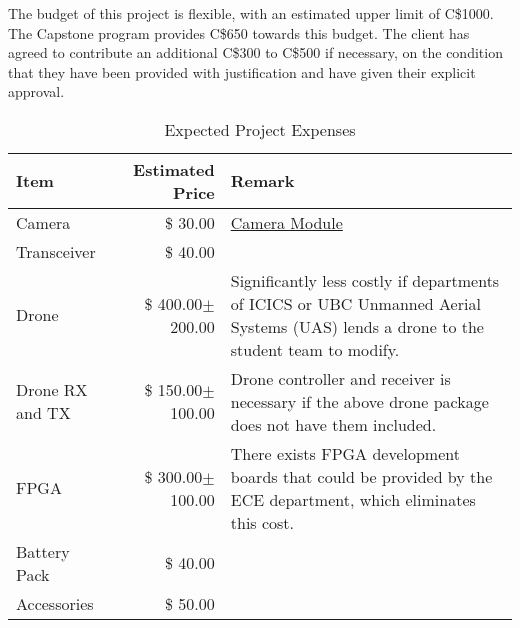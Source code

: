 The budget of this project is flexible, with an estimated upper limit of C\$1000. 
The Capstone program provides C\$650 towards this budget.
The client has agreed to contribute an additional C\$300 to C\$500 if necessary, on the condition that they have been provided with justification and have given their explicit approval.

\begin{table}[H]
    \centering
    \caption{Expected Project Expenses}
    \label{table:budget-items}

    \begin{tabular}{lrp{9cm}}

    \hline
    \textbf{Item} & \textbf{Estimated Price} & \textbf{Remark}\\
    \hline
    Camera&\$ \hfill30.00&\href{https://www.amazon.ca/Raspberry-Pi-Camera-Module-Megapixel/dp/B01ER2SKFS/ref=sr_1_3?crid=OOVX563QBZOF&keywords=raspberry+pi+camera&qid=1570511628&sprefix=raspbe\%2Caps\%2C238&sr=8-3}{Camera Module}\\
    Transceiver&\$ \hfill40.00&\\
    Drone&\$ \hfill400.00$\pm$200.00& Significantly less costly if departments of ICICS or UBC Unmanned Aerial Systems (UAS) lends a drone to the student team to modify.\\
    Drone RX and TX & \$ \hfill 150.00$\pm$100.00 & Drone controller and receiver is necessary if the above drone package does not have them included.\\
    FPGA&\$ \hfill 300.00$\pm$100.00& There exists FPGA development boards that could be provided by the ECE department, which eliminates this cost.\\
    Battery Pack&\$ \hfill40.00&\\
    Accessories&\$ \hfill50.00&\\
    \hline

    \end{tabular} 
\end{table}
